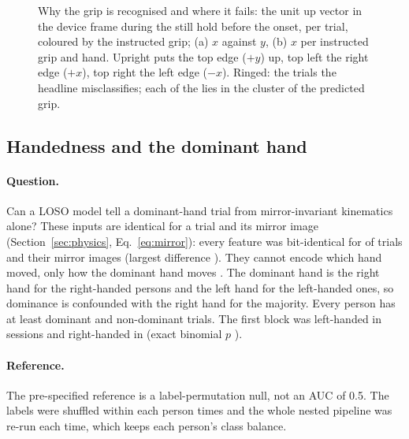 \begin{figure}[tbp]
\centering
{}
\caption{Why the grip is recognised and where it fails: the unit up vector in the device frame during the still
hold before the onset, per trial, coloured by the instructed grip; (a) $x$ against $y$, (b) $x$ per instructed grip
and hand. Upright puts the top edge ($+y$) up, top left the right edge ($+x$), top right the left edge ($-x$).
Ringed: the trials the headline misclassifies; each of the  lies in the
cluster of the predicted grip.}
\label{fig:SEC_05_grip_physics}\label{fig:app:sec-grip-physics}
\end{figure}


\FloatBarrier
\subsection{Handedness and the dominant hand}\label{app:sec:dominance}

\paragraph{Question.} Can a LOSO model tell a dominant-hand trial from mirror-invariant kinematics alone? These
inputs are identical for a trial and its mirror image (Section~\ref{sec:physics}, Eq.~\eqref{eq:mirror}): every
feature was bit-identical for  of  trials and their mirror images
(largest difference ). They cannot encode which hand moved, only how the dominant hand
moves \cite{sainburg2002dominance,przybyla2012dominance}. The dominant hand is the right hand for the
 right-handed persons and the left hand for the  left-handed ones, so
dominance is confounded with the right hand for the majority. Every person has at least
 dominant and  non-dominant trials. The first block was
left-handed in  sessions and right-handed in  (exact binomial $p$
).

\paragraph{Reference.} The pre-specified reference is a label-permutation null, not an AUC of 0.5. The labels
were shuffled within each person  times and the whole nested pipeline was re-run each time,
which keeps each person's class balance.

